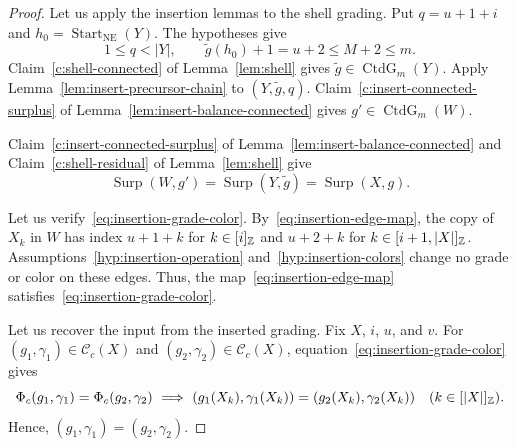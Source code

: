 \begin{proof}
 Let us apply the insertion lemmas to the shell grading.
Put $q=u+1+i$ and $h_0=\operatorname{Start}_{\mathrm{NE}}(Y)$.
The hypotheses give
\[
 1\le q<|Y|,\qquad \widetilde g(h_0)+1=u+2\le M+2\le m.
\]
Claim~\ref{c:shell-connected} of Lemma~\ref{lem:shell} gives
$\widetilde g\in\operatorname{CtdG}_m(Y)$.
Apply Lemma~\ref{lem:insert-precursor-chain} to $(Y,\widetilde g,q)$.
Claim~\ref{c:insert-connected-surplus} of Lemma~\ref{lem:insert-balance-connected}
gives $g'\in\operatorname{CtdG}_m(W)$.

Claim~\ref{c:insert-connected-surplus} of Lemma~\ref{lem:insert-balance-connected}
and Claim~\ref{c:shell-residual} of Lemma~\ref{lem:shell} give
\[
 \operatorname{Surp}(W,g')=\operatorname{Surp}(Y,\widetilde g)=\operatorname{Surp}(X,g).
\]

 Let us verify~\eqref{eq:insertion-grade-color}.
By~\eqref{eq:insertion-edge-map}, the copy of $X_k$ in $W$ has index $u+1+k$ for $k\in[i]_{\mathbb Z}$ and $u+2+k$ for $k\in[i+1,|X|]_{\mathbb Z}$.
Assumptions~\ref{hyp:insertion-operation} and~\ref{hyp:insertion-colors} change no grade or color on these edges.
Thus, the map~\eqref{eq:insertion-edge-map} satisfies~\eqref{eq:insertion-grade-color}.

 Let us recover the input from the inserted grading.
Fix $X$, $i$, $u$, and $v$.
For $(g_1,\gamma_1)\in\mathcal C_c(X)$ and $(g_2,\gamma_2)\in\mathcal C_c(X)$, equation~\eqref{eq:insertion-grade-color} gives
\[
 \Phi_c(g_1,\gamma_1)=\Phi_c(g_2,\gamma_2)
 \ \Longrightarrow\ 
 (g_1(X_k),\gamma_1(X_k))=(g_2(X_k),\gamma_2(X_k))
 \quad(k\in[|X|]_{\Z}).
\]
Hence, $(g_1,\gamma_1)=(g_2,\gamma_2)$.
\end{proof}

